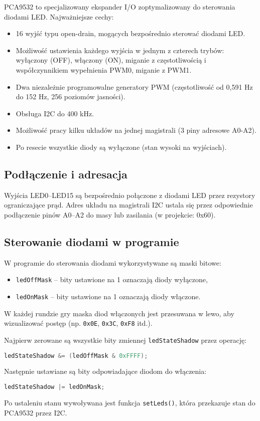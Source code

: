 \documentclass[a4paper,12pt]{report}
\begin{document}
PCA9532 to specjalizowany ekspander I/O zoptymalizowany do sterowania diodami LED. Najważniejsze cechy:
\begin{itemize}
    \item 16 wyjść typu open-drain, mogących bezpośrednio sterować diodami LED.
    \item Możliwość ustawienia każdego wyjścia w jednym z czterech trybów: wyłączony (OFF), włączony (ON), miganie z częstotliwością i współczynnikiem wypełnienia PWM0, miganie z PWM1.
    \item Dwa niezależnie programowalne generatory PWM (częstotliwość od 0,591 Hz do 152 Hz, 256 poziomów jasności).
    \item Obsługa I2C do 400 kHz.
    \item Możliwość pracy kilku układów na jednej magistrali (3 piny adresowe A0-A2).
    \item Po resecie wszystkie diody są wyłączone (stan wysoki na wyjściach).
\end{itemize}

\subsection{Podłączenie i adresacja}

Wyjścia LED0–LED15 są bezpośrednio połączone z diodami LED przez rezystory ograniczające prąd. Adres układu na magistrali I2C ustala się przez odpowiednie podłączenie pinów A0–A2 do masy lub zasilania (w projekcie: 0x60).

\subsection{Sterowanie diodami w programie}

W programie do sterowania diodami wykorzystywane są maski bitowe:
\begin{itemize}
    \item \texttt{ledOffMask} – bity ustawione na 1 oznaczają diody wyłączone,
    \item \texttt{ledOnMask} – bity ustawione na 1 oznaczają diody włączone.
\end{itemize}
W każdej rundzie gry maska diod włączonych jest przesuwana w lewo, aby wizualizować postęp (np. \texttt{0x0E}, \texttt{0x3C}, \texttt{0xF8} itd.).

Najpierw zerowane są wszystkie bity zmiennej \texttt{ledStateShadow} przez operację:
\begin{lstlisting}[language=C]
ledStateShadow &= (ledOffMask & 0xFFFF);
\end{lstlisting}
Następnie ustawiane są bity odpowiadające diodom do włączenia:
\begin{lstlisting}[language=C]
ledStateShadow |= ledOnMask;
\end{lstlisting}
Po ustaleniu stanu wywoływana jest funkcja \texttt{setLeds()}, która przekazuje stan do PCA9532 przez I2C.
\end{document}
